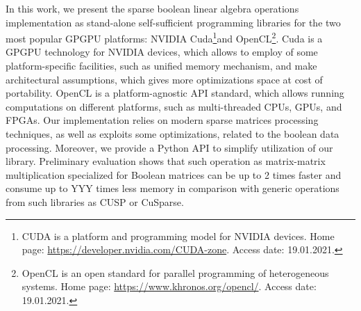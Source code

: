 In this work, we present the sparse boolean linear algebra operations implementation as stand-alone self-sufficient programming libraries for the two most popular GPGPU platforms: NVIDIA Cuda\footnote{CUDA is a platform and programming model for NVIDIA devices. Home page: \url{https://developer.nvidia.com/CUDA-zone}. Access date: 19.01.2021.}and OpenCL\footnote{OpenCL is an open standard for parallel programming of heterogeneous systems. Home page: \url{https://www.khronos.org/opencl/}. Access date: 19.01.2021.}.
Cuda is a GPGPU technology for NVIDIA devices, which allows to employ of some platform-specific facilities, such as unified memory mechanism, and make architectural assumptions, which gives more optimizations space at cost of portability. 
OpenCL is a platform-agnostic API standard, which allows running computations on different platforms, such as multi-threaded CPUs, GPUs, and FPGAs.
Our implementation relies on modern sparse matrices processing techniques, as well as exploits some optimizations, related to the boolean data processing.
Moreover, we provide a Python API to simplify utilization of our library.
Preliminary evaluation shows that such operation as matrix-matrix multiplication specialized for Boolean matrices can be up to 2 times faster and consume up to YYY times less memory in comparison with generic operations from such libraries as CUSP or CuSparse.
